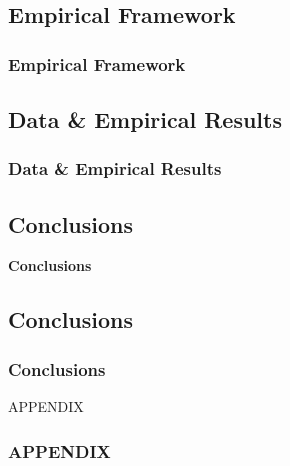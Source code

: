 \documentclass[11pt]{beamer}
\begin{document}
\begin{frame}
	\section{Empirical Framework}
	\frametitle{\bfseries Empirical Framework}
\end{frame}

\begin{frame}
	\section{Data \& Empirical Results}
	\frametitle{\bfseries Data \& Empirical Results}
\end{frame}

\begin{frame}
	\section{Conclusions}
	\begin{center}
	\textbf{{\LARGE Conclusions}}	
	\end{center}

\end{frame}

\begin{frame}
	\section{Conclusions}
	\frametitle{\bfseries Conclusions}
\end{frame}

\begin{frame}
	
	\begin{center}
		APPENDIX
	\end{center}
	\frametitle{\bfseries APPENDIX}
\end{frame}
\end{document}
